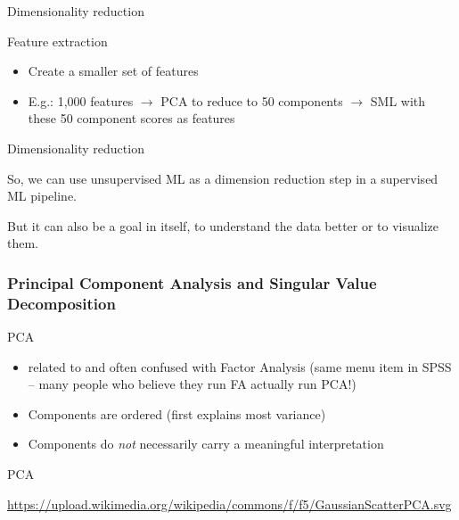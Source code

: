 \begin{frame}[fragile]{Dimensionality reduction}

\begin{block}{Feature extraction}
\begin{itemize}
\item Create a smaller set of features
\item E.g.: 1,000 features $\rightarrow$ PCA to reduce to 50 components $\rightarrow$ SML with these 50 component scores as features
\end{itemize}
\end{block}

\end{frame}



\begin{frame}[fragile]{Dimensionality reduction}

So, we can use unsupervised ML as a dimension reduction step in a supervised ML pipeline. 
\vspace{0.5cm}

But it can also be a goal in itself, to understand the data better or to visualize them.
\end{frame}







\subsubsection{Principal Component Analysis and Singular Value Decomposition}


\begin{frame}{PCA}
\begin{itemize}
\item related to and often confused with Factor Analysis (same menu item in SPSS -- many people who believe they run FA actually run PCA!)
\item Components are ordered (first explains most variance)
\item Components do \emph{not} necessarily carry a meaningful interpretation
\end{itemize}
\end{frame}

\begin{frame}{PCA}

\tiny{\url{https://upload.wikimedia.org/wikipedia/commons/f/f5/GaussianScatterPCA.svg}}
\end{frame}



